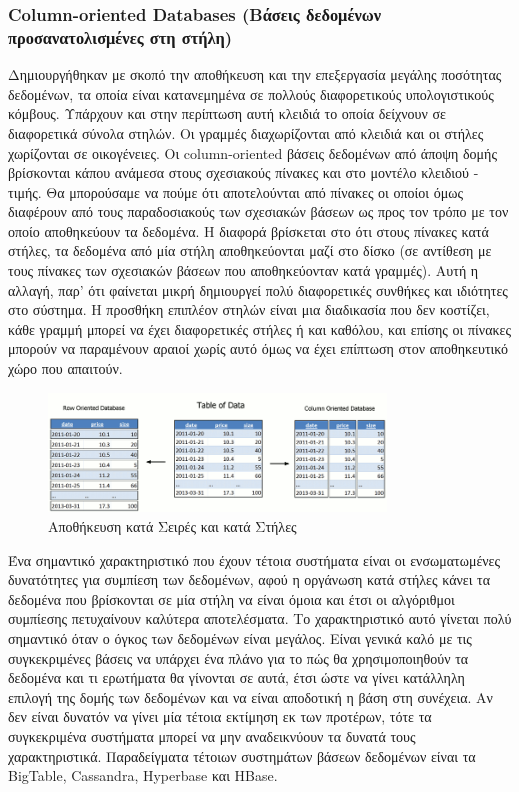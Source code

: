 		\subsubsection{Column-oriented Databases (Βάσεις δεδομένων προσανατολισμένες στη στήλη)}
		Δημιουργήθηκαν με σκοπό την αποθήκευση και την επεξεργασία μεγάλης ποσότητας δεδομένων, τα οποία είναι κατανεμημένα σε πολλούς διαφορετικούς υπολογιστικούς κόμβους. Υπάρχουν και στην περίπτωση αυτή κλειδιά το οποία δείχνουν σε διαφορετικά σύνολα στηλών. Οι γραμμές διαχωρίζονται από κλειδιά και οι στήλες χωρίζονται σε οικογένειες. Οι column-oriented βάσεις δεδομένων από άποψη δομής βρίσκονται κάπου ανάμεσα στους σχεσιακούς πίνακες και στο μοντέλο κλειδιού - τιμής. Θα μπορούσαμε να πούμε ότι αποτελούνται από πίνακες οι οποίοι όμως διαφέρουν από τους παραδοσιακούς των σχεσιακών βάσεων ως προς τον τρόπο με τον οποίο αποθηκεύουν τα δεδομένα. Η διαφορά βρίσκεται στο ότι στους πίνακες κατά στήλες, τα δεδομένα από μία στήλη αποθηκεύονται μαζί στο δίσκο (σε αντίθεση με τους πίνακες των σχεσιακών βάσεων που αποθηκεύονταν κατά γραμμές). Αυτή η αλλαγή, παρ' ότι φαίνεται μικρή δημιουργεί πολύ διαφορετικές συνθήκες και ιδιότητες στο σύστημα. Η προσθήκη επιπλέον στηλών είναι μια διαδικασία που δεν κοστίζει, κάθε γραμμή μπορεί να έχει διαφορετικές στήλες ή και καθόλου, και επίσης οι πίνακες μπορούν να παραμένουν αραιοί χωρίς αυτό όμως να έχει επίπτωση στον αποθηκευτικό χώρο που απαιτούν.
		
	\begin{figure}[h]
	    \centering
	    \includegraphics[width=0.8\textwidth]{column-vs-row-oriented-database.png}
	    \caption{Αποθήκευση κατά Σειρές και κατά Στήλες}
	    \label{fig:column-oriented-dbs}
	\end{figure}
	
	Ένα σημαντικό χαρακτηριστικό που έχουν τέτοια συστήματα είναι οι ενσωματωμένες δυνατότητες για συμπίεση των δεδομένων, αφού η οργάνωση κατά στήλες κάνει τα δεδομένα που βρίσκονται σε μία στήλη να είναι όμοια και έτσι οι αλγόριθμοι συμπίεσης πετυχαίνουν καλύτερα αποτελέσματα. Το χαρακτηριστικό αυτό γίνεται πολύ σημαντικό όταν ο όγκος των δεδομένων είναι μεγάλος. Είναι γενικά καλό με τις συγκεκριμένες βάσεις να υπάρχει ένα πλάνο για το πώς θα χρησιμοποιηθούν τα δεδομένα και τι ερωτήματα θα γίνονται σε αυτά, έτσι ώστε να γίνει κατάλληλη επιλογή της δομής των δεδομένων και να είναι αποδοτική η βάση στη συνέχεια. Αν δεν είναι δυνατόν να γίνει μία τέτοια εκτίμηση εκ των προτέρων, τότε τα συγκεκριμένα συστήματα μπορεί να μην αναδεικνύουν τα δυνατά τους χαρακτηριστικά. Παραδείγματα τέτοιων συστημάτων βάσεων δεδομένων είναι τα BigTable, Cassandra, Hyperbase και HBase\cite{abadi2006integrating}\cite{abadi2009column}.
	
